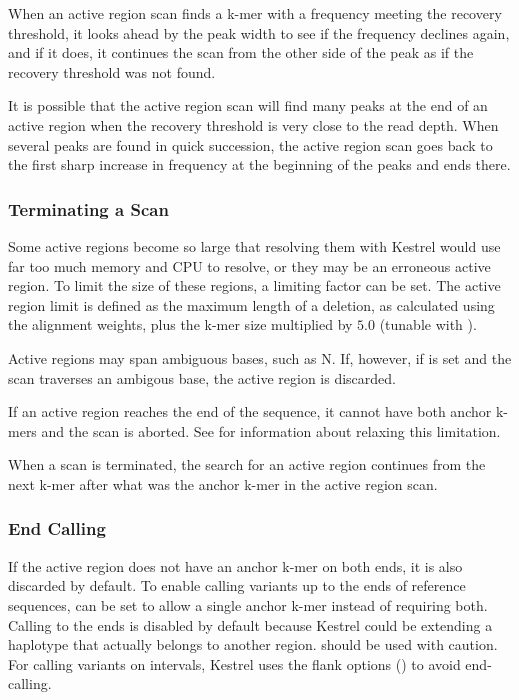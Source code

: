 When an active region scan finds a k-mer with a frequency meeting the recovery threshold, it looks ahead by the peak width to see if the frequency declines again, and if it does, it continues the scan from the other side of the peak as if the recovery threshold was not found.

It is possible that the active region scan will find many peaks at the end of an active region when the recovery threshold is very close to the read depth. When several peaks are found in quick succession, the active region scan goes back to the first sharp increase in frequency at the beginning of the peaks and ends there.

\subsubsection{Terminating a Scan}
\label{sec.process.ardetect.terminate}

Some active regions become so large that resolving them with Kestrel would use far too much memory and CPU to resolve, or they may be an erroneous active region. To limit the size of these regions, a limiting factor can be set. The active region limit is defined as the maximum length of a deletion, as calculated using the alignment weights, plus the k-mer size multiplied by $5.0$ (tunable with ).

Active regions may span ambiguous bases, such as N. If, however, if  is set and the scan traverses an ambigous base, the active region is discarded.

If an active region reaches the end of the sequence, it cannot have both anchor k-mers and the scan is aborted. See  for information about relaxing this limitation.

When a scan is terminated, the search for an active region continues from the next k-mer after what was the anchor k-mer in the active region scan.

\subsubsection{End Calling}
\label{sec.process.ardetect.endcalling}

If the active region does not have an anchor k-mer on both ends, it is also discarded by default. To enable calling variants up to the ends of reference sequences,  can be set to allow a single anchor k-mer instead of requiring both. Calling to the ends is disabled by default because Kestrel could be extending a haplotype that actually belongs to another region.  should be used with caution. For calling variants on intervals, Kestrel uses the flank options () to avoid end-calling.

